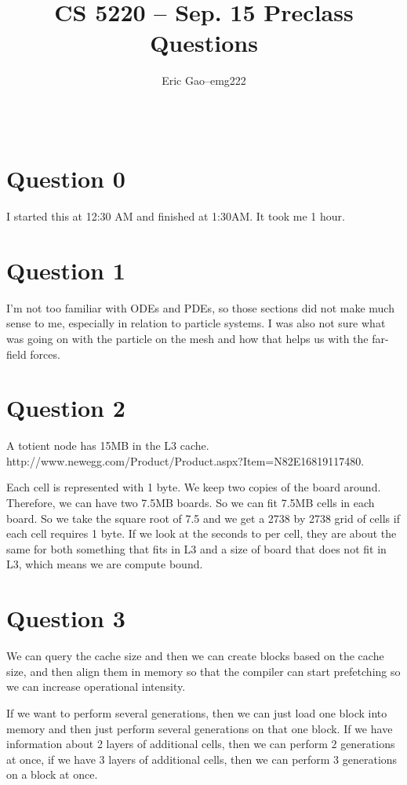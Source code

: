 \documentclass[11pt]{article}
\title{CS 5220 -- Sep. 15 Preclass Questions} %
\author{
  \begin{tabular}{l c l}
    Eric Gao & -- & emg222\\
  \end{tabular}\\
  \rule{\linewidth}{0.4pt}
}
\date{}
\begin{document}
    \thispagestyle{empty}
    \maketitle

    \section*{Question 0}
        I started this at 12:30 AM and finished at 1:30AM. It took me 1 hour.

    \section*{Question 1}
        I'm not too familiar with ODEs and PDEs, so those sections did not make much sense to me, especially in relation to particle systems. I was also not sure what was going on with the particle on the mesh and how that helps us with the far-field forces.

    \section*{Question 2}
        A totient node has 15MB in the L3 cache. \\
        http://www.newegg.com/Product/Product.aspx?Item=N82E16819117480.

        Each cell is represented with 1 byte. We keep two copies of the board around. Therefore, we can have two 7.5MB boards. So we can fit 7.5MB cells in each board. So we take the square root of 7.5 and we get a 2738 by 2738 grid of cells if each cell requires 1 byte. If we look at the seconds to per cell, they are about the same for both something that fits in L3 and a size of board that does not fit in L3, which means we are compute bound.

    \section*{Question 3}
        We can query the cache size and then we can create blocks based on the cache size, and then align them in memory so that the compiler can start prefetching so we can increase operational intensity.

        If we want to perform several generations, then we can just load one block into memory and then just perform several generations on that one block. If we have information about 2 layers of additional cells, then we can perform 2 generations at once, if we have 3 layers of additional cells, then we can perform 3 generations on a block at once. 
\end{document}
